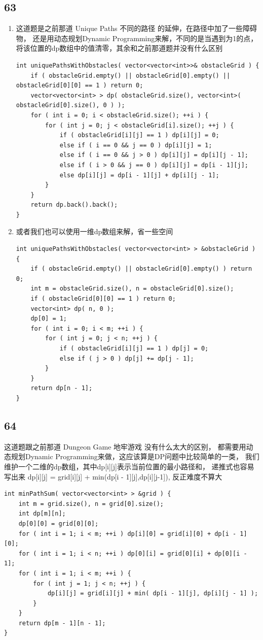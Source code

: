 \documentclass[12pt,a4paper]{article}
\begin{document}
\subsection{63}
\begin{enumerate}
\item
\begin{CJK}{UTF8}{gbsn}
这道题是之前那道 Unique Paths 不同的路径 的延伸，在路径中加了一些障碍物，
还是用动态规划Dynamic Programming来解，不同的是当遇到为1的点，
将该位置的dp数组中的值清零，其余和之前那道题并没有什么区别
\end{CJK}
\begin{lstlisting}
int uniquePathsWithObstacles( vector<vector<int>>& obstacleGrid ) {
	if ( obstacleGrid.empty() || obstacleGrid[0].empty() || obstacleGrid[0][0] == 1 ) return 0;
	vector<vector<int> > dp( obstacleGrid.size(), vector<int>( obstacleGrid[0].size(), 0 ) );
	for ( int i = 0; i < obstacleGrid.size(); ++i ) {
		for ( int j = 0; j < obstacleGrid[i].size(); ++j ) {
			if ( obstacleGrid[i][j] == 1 ) dp[i][j] = 0;
			else if ( i == 0 && j == 0 ) dp[i][j] = 1;
			else if ( i == 0 && j > 0 ) dp[i][j] = dp[i][j - 1];
			else if ( i > 0 && j == 0 ) dp[i][j] = dp[i - 1][j];
			else dp[i][j] = dp[i - 1][j] + dp[i][j - 1];
		}
	}
	return dp.back().back();
}
\end{lstlisting}
\item
\begin{CJK}{UTF8}{gbsn}
或者我们也可以使用一维dp数组来解，省一些空间
\end{CJK}
\begin{lstlisting}
int uniquePathsWithObstacles( vector<vector<int> > &obstacleGrid ) {
	if ( obstacleGrid.empty() || obstacleGrid[0].empty() ) return 0;
	int m = obstacleGrid.size(), n = obstacleGrid[0].size();
	if ( obstacleGrid[0][0] == 1 ) return 0;
	vector<int> dp( n, 0 );
	dp[0] = 1;
	for ( int i = 0; i < m; ++i ) {
		for ( int j = 0; j < n; ++j ) {
			if ( obstacleGrid[i][j] == 1 ) dp[j] = 0;
			else if ( j > 0 ) dp[j] += dp[j - 1];
		}
	}
	return dp[n - 1];
}
\end{lstlisting}
\end{enumerate}

\subsection{64}
\begin{CJK}{UTF8}{gbsn}
这道题跟之前那道 Dungeon Game 地牢游戏 没有什么太大的区别，
都需要用动态规划Dynamic Programming来做，这应该算是DP问题中比较简单的一类，
我们维护一个二维的dp数组，其中dp[i][j]表示当前位置的最小路径和，
递推式也容易写出来 dp[i][j] = grid[i][j] + min(dp[i - 1][j],dp[i][j-1]), 反正难度不算大
\end{CJK}
\begin{lstlisting}
int minPathSum( vector<vector<int> > &grid ) {
	int m = grid.size(), n = grid[0].size();
	int dp[m][n];
	dp[0][0] = grid[0][0];
	for ( int i = 1; i < m; ++i ) dp[i][0] = grid[i][0] + dp[i - 1][0];
	for ( int i = 1; i < n; ++i ) dp[0][i] = grid[0][i] + dp[0][i - 1];
	for ( int i = 1; i < m; ++i ) {
		for ( int j = 1; j < n; ++j ) {
			dp[i][j] = grid[i][j] + min( dp[i - 1][j], dp[i][j - 1] );
		}
	}
	return dp[m - 1][n - 1];
}
\end{lstlisting}
\end{document}
